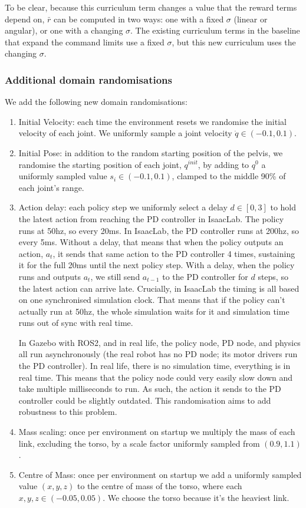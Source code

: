 \documentclass[11pt]{article}
\begin{document}
To be clear, because this curriculum term changes a value that the reward terms depend on, $\bar r$ can be computed in two ways: one with a fixed $\sigma$ (linear or angular), or one with a changing $\sigma$. The existing curriculum terms in the baseline that expand the command limits use a fixed $\sigma$, but this new curriculum uses the changing $\sigma$.
\subsubsection{Additional domain randomisations}
We add the following new domain randomisations:
\begin{enumerate}
    \item Initial Velocity: each time the environment resets we randomise the initial velocity of each joint. We uniformly sample a joint velocity $\dot q \in (-0.1, 0.1)$.
    \item Initial Pose: in addition to the random starting position of the pelvis, we randomise the starting position of each joint, $q^{init}$, by adding to $q^0$ a uniformly sampled value $s_i \in (-0.1, 0.1)$, clamped to the middle 90\% of each joint's range.
    \item Action delay: each policy step we uniformly select a delay $d \in [0, 3]$ to hold the latest action from reaching the PD controller in IsaacLab. The policy runs at 50hz, so every 20ms. In IsaacLab, the PD controller runs at 200hz, so every 5ms. Without a delay, that means that when the policy outputs an action, $a_t$, it sends that same action to the PD controller 4 times, sustaining it for the full 20ms until the next policy step. With a delay, when the policy runs and outputs $a_t$, we still send $a_{t-1}$ to the PD controller for $d$ steps, so the latest action can arrive late. Crucially, in IsaacLab the timing is all based on one synchronised simulation clock. That means that if the policy can't actually run at 50hz, the whole simulation waits for it and simulation time runs out of sync with real time.

    In Gazebo with ROS2, and in real life, the policy node, PD node, and physics all run asynchronously (the real robot has no PD node; its motor drivers run the PD controller). In real life, there is no simulation time, everything is in real time. This means that the policy node could very easily slow down and take multiple milliseconds to run. As such, the action it sends to the PD controller could be slightly outdated. This randomisation aims to add robustness to this problem.
    \item Mass scaling: once per environment on startup we multiply the mass of each link, excluding the torso, by a scale factor uniformly sampled from $(0.9, 1.1)$.
    \item Centre of Mass: once per environment on startup we add a uniformly sampled value $(x,y,z)$ to the centre of mass of the torso, where each $x,y,z \in (-0.05, 0.05)$. We choose the torso because it's the heaviest link.
\end{enumerate}
\end{document}
